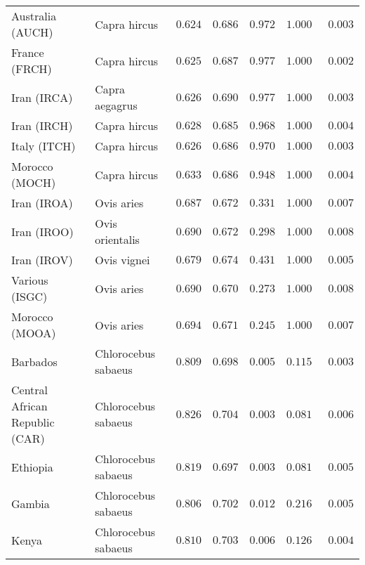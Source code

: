 \begin{center}
\begin{adjustbox}{width = 1\textwidth}
\begin{tabular}{|l|l|r|r|r|r|r|}
            Australia (AUCH)                    & Capra hircus      & $ 0.624$ & $ 0.686$ & $ 0.972$ & $ 1.000~~$     & $ 0.003$ \\
            France (FRCH)                    & Capra hircus        & $ 0.625$ & $ 0.687$ & $ 0.977$ & $ 1.000~~$     & $ 0.002$ \\
            Iran (IRCA)                   & Capra aegagrus        & $ 0.626$ & $ 0.690$ & $ 0.977$ & $ 1.000~~$     & $ 0.003$ \\
            Iran (IRCH)                 & Capra hircus        & $ 0.628$ & $ 0.685$ & $ 0.968$ & $ 1.000~~$     & $ 0.004$ \\
            Italy (ITCH)                    & Capra hircus          & $ 0.626$ & $ 0.686$ & $ 0.970$ & $ 1.000~~$     & $ 0.003$ \\
            Morocco (MOCH)                    & Capra hircus     & $ 0.633$ & $ 0.686$ & $ 0.948$ & $ 1.000~~$     & $ 0.004$ \\
            Iran (IROA)                    & Ovis aries         & $ 0.687$ & $ 0.672$ & $ 0.331$ & $ 1.000~~$     & $ 0.007$ \\
            Iran (IROO)                 & Ovis orientalis          & $ 0.690$ & $ 0.672$ & $ 0.298$ & $ 1.000~~$     & $ 0.008$ \\
            Iran (IROV)                 & Ovis vignei          & $ 0.679$ & $ 0.674$ & $ 0.431$ & $ 1.000~~$     & $ 0.005$ \\
            Various (ISGC)                       & Ovis aries & $ 0.690$ & $ 0.670$ & $ 0.273$ & $ 1.000~~$     & $ 0.008$ \\
            Morocco (MOOA) & Ovis aries & $ 0.694$ & $ 0.671$ & $ 0.245$ & $ 1.000~~$ & $ 0.007$ \\
            Barbados                       & Chlorocebus sabaeus & $ 0.809$ & $ 0.698$ & $ 0.005$ & $ 0.115~~$     & $ 0.003$ \\
            Central African Republic (CAR)                         & Chlorocebus sabaeus & $ 0.826$ & $ 0.704$ & $ 0.003$ & $ 0.081~~$     & $ 0.006$ \\
            Ethiopia                          & Chlorocebus sabaeus & $ 0.819$ & $ 0.697$ & $ 0.003$ & $ 0.081~~$     & $ 0.005$ \\
            Gambia                          & Chlorocebus sabaeus & $ 0.806$ & $ 0.702$ & $ 0.012$ & $ 0.216~~$     & $ 0.005$ \\
            Kenya              & Chlorocebus sabaeus & $ 0.810$ & $ 0.703$ & $ 0.006$ & $ 0.126~~$     & $ 0.004$ \\

\end{tabular}
\end{adjustbox}
\end{center}
